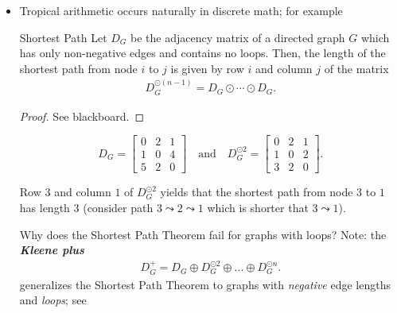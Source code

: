 \documentclass{article}
\begin{document}
\begin{itemize}
	 \item Tropical arithmetic occurs naturally in discrete math; for example

		\begin{theorem*}{Shortest Path \cite[Prop. 7.9]{inv2nonlinearalgebra}}{}
			Let \( D_G  \) be the adjacency matrix of a directed graph \( G \) which has only non-negative edges and contains no loops.
			Then, the length of the shortest path from node \( i \) to \( j \) is given by row \( i \) and column \( j \) of the matrix 
			\begin{align*}
				D_G^{\odot(n-1)} = D_G \odot \cdots \odot D_G.
			\end{align*}
		\end{theorem*}

		\begin{proof}
			See blackboard.
		\end{proof}
		
		\begin{example*}{}{}
			\begin{figure}[H]
				\centering
				
			\end{figure}
			$$
				D_G = \begin{bmatrix}
					0 & 2 & 1 \\
					1 & 0 & 4 \\
					5 & 2 & 0
				\end{bmatrix} \quad \text{and} \quad D_G^{\odot 2} = \begin{bmatrix}
					0 & 2 &1 \\ 1 & 0 & 2 \\ 3 & 2 & 0
				\end{bmatrix}.
			$$

			Row \( 3 \) and column \( 1 \) of \(  D_G^{\odot 2} \) yields that the shortest path from node \( 3 \) to \( 1 \) has length \( 3 \) (consider path \( 3 \leadsto 2 \leadsto 1 \) which is shorter that \( 3 \leadsto 1 \)). 
		\end{example*}
		
		\begin{exercise}{	Why does the Shortest Path Theorem fail for graphs with loops?}{}
			Note: the \textbf{\textit{Kleene plus}}
			\begin{align*}
				D_G^+ = D_G \oplus D_G^{\odot 2} \oplus ... \oplus D_G^{\odot n}.
			\end{align*} generalizes the Shortest Path Theorem to graphs with \emph{negative} edge lengths and \emph{loops}; see \cite[Exercise 1.9 (5)]{MaclaganSturmfels}
		 \end{exercise}
 	

\end{itemize}
\end{document}
